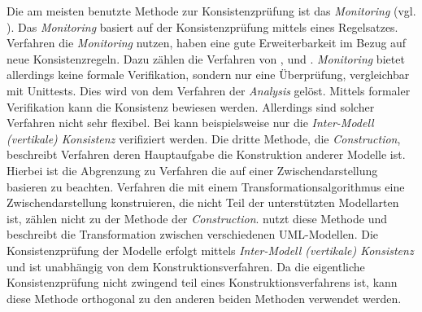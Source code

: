 Die am meisten benutzte Methode zur Konsistenzprüfung ist das \emph{Monitoring} (vgl. \cite{Usman2008}).
Das \emph{Monitoring} basiert auf der Konsistenzprüfung mittels eines Regelsatzes. 
Verfahren die \emph{Monitoring} nutzen, haben eine gute Erweiterbarkeit im Bezug auf neue Konsistenzregeln.
Dazu zählen die Verfahren von \cite{Rasch2003}, \cite{Mens2005} und \cite{Egyed2006}.
\emph{Monitoring} bietet allerdings keine formale Verifikation, sondern nur eine Überprüfung, vergleichbar mit Unittests.
Dies wird von dem Verfahren der \emph{Analysis} gelöst.
Mittels formaler Verifikation kann die Konsistenz bewiesen werden.
Allerdings sind solcher Verfahren nicht sehr flexibel.
Bei \cite{Shinkawa2006} kann beispielsweise nur die \emph{Inter-Modell (vertikale) Konsistenz} verifiziert werden.
Die dritte Methode, die \emph{Construction}, beschreibt Verfahren deren Hauptaufgabe die Konstruktion anderer Modelle ist.
Hierbei ist die Abgrenzung zu Verfahren die auf einer Zwischendarstellung basieren zu beachten.
Verfahren die mit einem Transformationsalgorithmus eine Zwischendarstellung konstruieren, die nicht Teil der unterstützten Modellarten ist, zählen nicht zu der Methode der \emph{Construction}.
\cite{Egyed2001} nutzt diese Methode und beschreibt die Transformation zwischen verschiedenen UML-Modellen.
Die Konsistenzprüfung der Modelle erfolgt mittels \emph{Inter-Modell (vertikale) Konsistenz} und ist unabhängig von dem Konstruktionsverfahren.
Da die eigentliche Konsistenzprüfung nicht zwingend teil eines Konstruktionsverfahrens ist, kann diese Methode orthogonal zu den anderen beiden Methoden verwendet werden.
